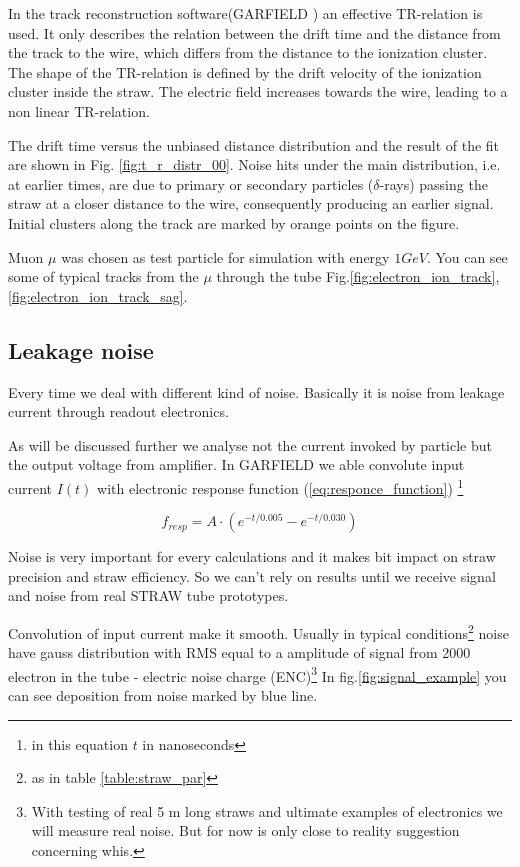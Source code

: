 \documentclass[12pt,a4paper]{article}
\begin{document}
	In the track reconstruction software(GARFIELD \cite{garfield}) an effective TR-relation is used. It only describes the relation between the drift time and the distance from the track to the wire, which differs from the distance to the ionization cluster. The shape of the TR-relation is defined by the drift velocity of the ionization cluster inside the straw. The electric field increases towards the wire, leading to a non linear TR-relation. 

	The drift time versus the unbiased distance distribution and the result of the fit are shown in Fig. \ref{fig:t_r_distr_00}. Noise hits under the main distribution, i.e. at earlier times, are due to primary or secondary particles ($\delta$-rays) passing the straw at a closer distance to the wire, consequently producing an earlier signal. Initial clusters along the track are marked by orange points on the figure.
	
	Muon $\mu$ was chosen as test particle for simulation with energy $1GeV$. You can see some of typical tracks from the $\mu$ through the tube Fig.\ref{fig:electron_ion_track},\ref{fig:electron_ion_track_sag}. 
			
	
	\subsection{ Leakage noise}
	Every time we deal with different kind of noise. Basically it is noise from  leakage current through readout electronics.

	As will be discussed further we analyse not the current invoked by particle but the output voltage from amplifier. In GARFIELD we able convolute input current $I(t)$ with electronic response function (\ref{eq:responce_function}) \footnote{in this equation $t$ in nanoseconds} 
	
	\begin{equation}
	f_{resp} =  A\cdot(e^{-t/0.005} - e^{-t/0.030})
	\label{eq:responce_function}
	\end{equation}
	
	Noise is very important for every calculations and it makes bit impact on straw precision and straw efficiency. So we can't rely on results until we receive signal and noise  from real STRAW tube prototypes.
		
	Convolution of input current make it smooth. Usually in typical conditions\footnote{as in table \ref{table:straw_par}} noise have gauss distribution with RMS equal to a amplitude of signal from 2000 electron in the tube - electric noise charge (ENC)\footnote{With testing of real 5 m long straws and ultimate examples of electronics we will measure real noise. But for now is only close to reality suggestion concerning whis.}	In fig.\ref{fig:signal_example} you can see deposition from noise marked by blue line.
\end{document}
